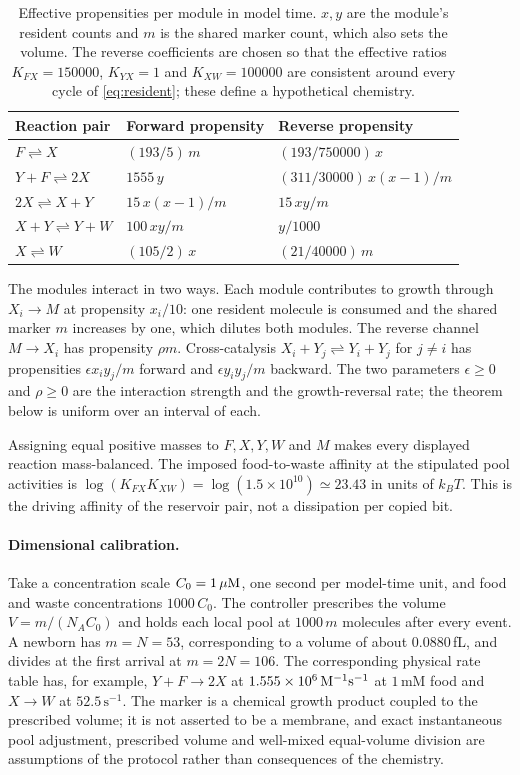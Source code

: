 \begin{table}[t]
\centering
\caption{Effective propensities per module in model time. $x,y$ are the module's resident counts and $m$ is the shared marker count, which also sets the volume. The reverse coefficients are chosen so that the effective ratios $K_{FX}=150000$, $K_{YX}=1$ and $K_{XW}=100000$ are consistent around every cycle of \eqref{eq:resident}; these define a hypothetical chemistry.}\label{tab:rates}
\begin{tabular}{@{}lll@{}}\toprule
Reaction pair & Forward propensity & Reverse propensity\\\midrule
$F\rightleftharpoons X$ & $(193/5)\,m$ & $(193/750000)\,x$\\
$Y+F\rightleftharpoons2X$ & $1555\,y$ & $(311/30000)\,x(x-1)/m$\\
$2X\rightleftharpoons X+Y$ & $15\,x(x-1)/m$ & $15\,xy/m$\\
$X+Y\rightleftharpoons Y+W$ & $100\,xy/m$ & $y/1000$\\
$X\rightleftharpoons W$ & $(105/2)\,x$ & $(21/40000)\,m$\\\bottomrule
\end{tabular}
\end{table}

The modules interact in two ways. Each module contributes to growth through $X_i\to M$ at propensity $x_i/10$: one resident molecule is consumed and the shared marker $m$ increases by one, which dilutes both modules. The reverse channel $M\to X_i$ has propensity $\rho m$. Cross-catalysis $X_i+Y_j\rightleftharpoons Y_i+Y_j$ for $j\ne i$ has propensities $\epsilon x_iy_j/m$ forward and $\epsilon y_iy_j/m$ backward. The two parameters $\epsilon\ge0$ and $\rho\ge0$ are the interaction strength and the growth-reversal rate; the theorem below is uniform over an interval of each.

Assigning equal positive masses to $F,X,Y,W$ and $M$ makes every displayed reaction mass-balanced. The imposed food-to-waste affinity at the stipulated pool activities is $\log(K_{FX}K_{XW})=\log(1.5\times10^{10})\simeq23.43$ in units of $k_BT$. This is the driving affinity of the reservoir pair, not a dissipation per copied bit.

\paragraph{Dimensional calibration.}
Take a concentration scale $C_0=1\,\mu\mathrm{M}$, one second per model-time unit, and food and waste concentrations $1000\,C_0$. The controller prescribes the volume $V=m/(N_AC_0)$ and holds each local pool at $1000\,m$ molecules after every event. A newborn has $m=N=53$, corresponding to a volume of about $0.0880$\,fL, and divides at the first arrival at $m=2N=106$. The corresponding physical rate table has, for example, $Y+F\to2X$ at $1.555\times10^6\,\mathrm{M}^{-1}\mathrm s^{-1}$ at $1$\,mM food and $X\to W$ at $52.5\,\mathrm s^{-1}$. The marker is a chemical growth product coupled to the prescribed volume; it is not asserted to be a membrane, and exact instantaneous pool adjustment, prescribed volume and well-mixed equal-volume division are assumptions of the protocol rather than consequences of the chemistry.


